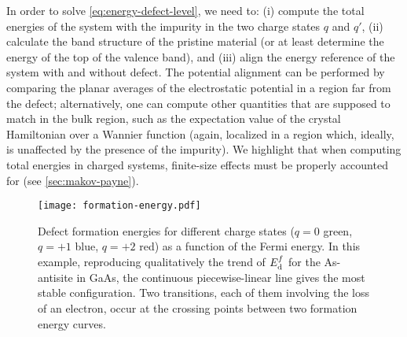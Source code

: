 In order to solve \cref{eq:energy-defect-level}, we need to: (i) compute the total energies of the system with the impurity in the two charge states $q$ and $q'$, (ii) calculate the band structure of the pristine material (or at least determine the energy of the top of the valence band), and (iii) align the energy reference of the system with and without defect. The potential alignment can be performed by comparing the planar averages of the electrostatic potential in a region far from the defect; alternatively, one can compute other quantities that are supposed to match in the bulk region, such as the expectation value of the crystal Hamiltonian over a Wannier function (again, localized in a region which, ideally, is unaffected by the presence of the impurity). We highlight that when computing total energies in charged systems, finite-size effects must be properly accounted for (see \cref{sec:makov-payne}).

\begin{figure}
    \centering
    \texttt{[image: formation-energy.pdf]}
    \caption[Charge-transition states obtained from the defect formation energy]{Defect formation energies for different charge states ($q=0$ green, $q=+1$ blue, $q=+2$ red) as a function of the Fermi energy. In this example, reproducing qualitatively the trend of $E^f_{\rm d}$ for the As-antisite in GaAs, the continuous piecewise-linear line gives the most stable configuration. Two transitions, each of them involving the loss of an electron, occur at the crossing points between two formation energy curves.}
    \label{fig:formation-energy}
\end{figure}

